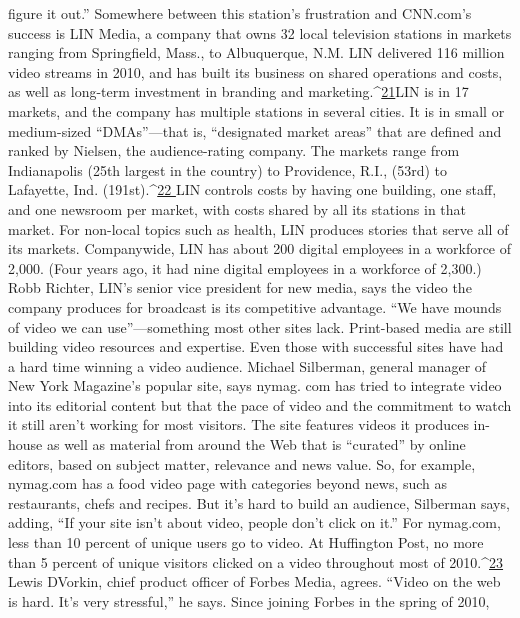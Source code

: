 figure it out.''
Somewhere between this station’s frustration and CNN.com’s success is LIN
Media, a company that owns 32 local television stations in markets ranging
from Springfield, Mass., to Albuquerque, N.M. LIN delivered 116 million video
streams in 2010, and has built its business on shared operations and costs, as well
as long-term investment in branding and marketing.^{\href{#endnotes-ch4}{21}}LIN is in 17 markets, and the company has multiple stations in several cities. It
is in small or medium-sized ``DMAs''—that is, ``designated market areas'' that are
defined and ranked by Nielsen, the audience-rating company. The markets range
from Indianapolis (25th largest in the country) to Providence, R.I., (53rd) to
Lafayette, Ind. (191st).^{\href{#endnotes-ch4}{22 }}LIN controls costs by having one building, one staff, and
one newsroom per market, with costs shared by all its stations in that market. For
non-local topics such as health, LIN produces stories that serve all of its markets.
Companywide, LIN has about 200 digital employees in a workforce of 2,000.
(Four years ago, it had nine digital employees in a workforce of 2,300.) Robb
Richter, LIN’s senior vice president for new media, says the video the company
produces for broadcast is its competitive advantage. ``We have mounds of video
we can use''—something most other sites lack.
Print-based media are still building video resources and expertise. Even those
with successful sites have had a hard time winning a video audience. Michael
Silberman, general manager of New York Magazine’s popular site, says nymag.
com has tried to integrate video into its editorial content but that the pace of
video and the commitment to watch it still aren’t working for most visitors. The
site features videos it produces in-house as well as material from around the Web
that is ``curated'' by online editors, based on subject matter, relevance and news
value. So, for example, nymag.com has a food video page with categories beyond
news, such as restaurants, chefs and recipes. But it’s hard to build an audience,
Silberman says, adding, ``If your site isn’t about video, people don’t click on it.''
For nymag.com, less than 10 percent of unique users go to video. At Huffington
Post, no more than 5 percent of unique visitors clicked on a video throughout
most of 2010.^{\href{#endnotes-ch4}{23}}%
Lewis DVorkin, chief product officer of Forbes Media, agrees. ``Video on the
web is hard. It’s very stressful,'' he says. Since joining Forbes in the spring of 2010,
